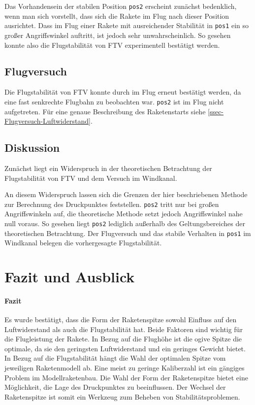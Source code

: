 \documentclass[10pt,a4paper]{article}
\begin{document}
Das Vorhandensein der stabilen Position \texttt{pos2} erscheint zunächst bedenklich, wenn man sich vorstellt, dass sich die Rakete im Flug nach dieser Position ausrichtet. Dass im Flug einer Rakete mit ausreichender Stabilität in \texttt{pos1} ein so großer Angriffswinkel auftritt, ist jedoch sehr unwahrscheinlich. So gesehen konnte also die Flugstabilität von FTV experimentell bestätigt werden.


\subsection{Flugversuch}

Die Flugstabilität von FTV konnte durch im Flug erneut bestätigt werden, da eine fast senkrechte Flugbahn zu beobachten war. \texttt{pos2} ist im Flug nicht aufgetreten. Für eine genaue Beschreibung des Raketenstarts siehe \ref{ssec-Flugversuch-Luftwiderstand}.


\subsection{Diskussion}

Zunächst liegt ein Widerspruch in der theoretischen Betrachtung der Flugstabilität von FTV und dem Versuch im Windkanal.

An diesem Widerspruch lassen sich die Grenzen der hier beschriebenen Methode zur Berechnung des Druckpunktes feststellen. \texttt{pos2} tritt nur bei großen Angriffswinkeln auf, die theoretische Methode setzt jedoch Angriffswinkel nahe null voraus. So gesehen liegt \texttt{pos2} lediglich außerhalb des Geltungsbereiches der theoretischen Betrachtung. Der Flugversuch und das stabile Verhalten in \texttt{pos1} im Windkanal belegen die vorhergesagte Flugstabilität.



\section{Fazit und Ausblick}

\paragraph{Fazit}
Es wurde bestätigt, dass die Form der Raketenspitze sowohl Einfluss auf den Luftwiderstand als auch die Flugstabilität hat. Beide Faktoren sind wichtig für die Flugleistung der Rakete.
In Bezug auf die Flughöhe ist die ogive Spitze die optimale, da sie den geringsten Luftwiderstand und ein geringes Gewicht bietet.
In Bezug auf die Flugstabilität hängt die Wahl der optimalen Spitze vom jeweiligen Raketenmodell ab. Eine meist zu geringe Kaliberzahl ist ein gängiges Problem im Modellraketenbau. Die Wahl der Form der Raketenspitze bietet eine Möglichkeit, die Lage des Druckpunktes zu beeinflussen. Der Wechsel der Raketenspitze ist somit ein Werkzeug zum Beheben von Stabilitätsproblemen.
\end{document}
